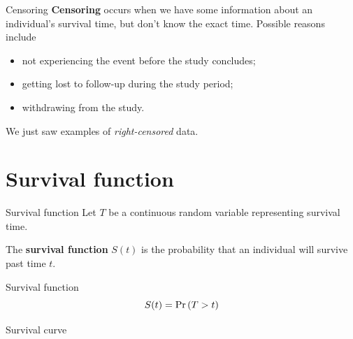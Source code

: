 \begin{frame}{Censoring}
    \textbf{Censoring} occurs when we have some information about an individual's survival time, but don't know the exact time.
    Possible reasons include
    \begin{itemize}
        \item not experiencing the event before the study concludes;
        \item getting lost to follow-up during the study period;
        \item withdrawing from the study.
    \end{itemize}

    \pause
    We just saw examples of \emph{right-censored} data.
\end{frame}

\section{Survival function}
\begin{frame}{Survival function}
    Let $T$ be a continuous random variable representing survival time.

    The \textbf{survival function} $S(t)$ is the probability that an individual will survive past time $t$. 
    \pause
    \begin{block}{Survival function}
        $$S(t) = \Pr{\left(T > t\right)}$$
    \end{block}
\end{frame}

\begin{frame}{Survival curve}
    \centering
\end{frame}


